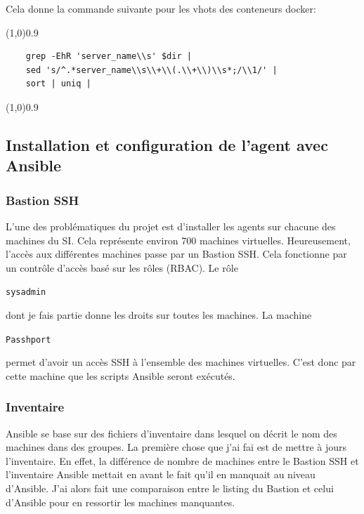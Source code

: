 \documentclass[12pt, a4paper, twoside]{article}
\begin{document}
Cela donne la commande suivante pour les vhots des conteneurs docker:
\vspace{-1ex}
\begin{code}
\vspace{-1ex}
\begin{center} 
    \line(1,0){0.9\textwidth} 
\end{center}
\vspace{-1ex}
\begin{verbatim}
    grep -EhR 'server_name\\s' $dir | 
    sed 's/^.*server_name\\s\\+\\(.\\+\\)\\s*;/\\1/' |
    sort | uniq |
\end{verbatim}
\vspace{-1ex}
\begin{center} 
    \line(1,0){0.9\textwidth} 
\end{center}
\end{code}

\newpage
\subsection{Installation et configuration de l'agent avec Ansible}
\subsubsection{Bastion SSH}
L'une des problématiques du projet est d'installer les agents sur chacune des machines du \gls{SI}. 
Cela représente environ 700 machines virtuelles. 
Heureusement, l'accès aux différentes machines passe par un Bastion SSH. 
Cela fonctionne par un contrôle d'accès basé sur les rôles (\gls{RBAC}). 
Le rôle\begin{code}\texttt{sysadmin}\end{code} dont je fais partie donne les droits sur toutes les machines. 
La machine \begin{code}\texttt{Passhport}\end{code} permet d'avoir un accès SSH à l'ensemble des machines virtuelles.
C'est donc par cette machine que les scripts \gls{Ansible} seront exécutés.

\subsubsection{Inventaire}
\gls{Ansible} se base sur des fichiers d'inventaire dans lesquel on décrit le nom des machines dans des groupes. 
La première chose que j'ai fai est de mettre à jours l'inventaire. 
En effet, la différence de nombre de machines entre le Bastion SSH et l'inventaire \gls{Ansible} mettait en avant le fait qu'il en manquait au niveau d'\gls{Ansible}. 
J'ai alors fait une comparaison entre le listing du Bastion et celui d'\gls{Ansible} pour en ressortir les machines manquantes.
\end{document}
